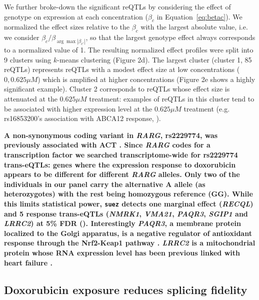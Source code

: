 \documentclass[9pt,lineno]{elife}
\newcommand{\tempbold}[1]{\textbf{#1}}
\begin{document}
We further broke-down the significant reQTLs by considering the effect of genotype on expression at each concentration ($\beta_c$ in Equation~\ref{eq:betac}). We normalized the effect sizes relative to the $\beta_c$ with the largest absolute value, i.e. we consider $\beta_c / \beta_{\arg \max{ |\beta_{c'}| }} $, so that the largest genotype effect always corresponds to a normalized value of 1. The resulting normalized effect profiles were split into 9 clusters using $k$-means clustering (Figure 2d). The largest cluster (cluster 1, 85 reQTLs) represents reQTLs with a modest effect size at low concentrations ($0,0.625\mu M$) which is amplified at higher concentrations (Figure 2e shows a highly significant example). Cluster 2 corresponds to reQTLs whose effect size is attenuated at the $0.625\mu M$ treatment: examples of reQTLs in this cluster tend to be associated with higher expression level at the $0.625\mu M$ treatment (e.g. rs16853200's association with ABCA12 response, ). 

\tempbold{ A non-synonymous coding variant in \emph{RARG}, rs2229774, was previously associated with ACT \citep{Aminkeng2015}. Since \emph{RARG} codes for a transcription factor we searched transcriptome-wide for rs2229774 trans-eQTLs: genes where the expression response to doxorubicin appears to be different for different \emph{RARG} alleles. Only two of the individuals in our panel carry the alternative A allele (as heterozygotes) with the rest being homozygous reference (GG). While this limits statistical power, \texttt{suez} detects one marginal effect (\emph{RECQL}) and 5 response trans-eQTLs (\emph{NMRK1}, \emph{VMA21}, \emph{PAQR3}, \emph{SGIP1} and \emph{LRRC2}) at 5\% FDR (\FIGSUPP[fig2]{rarg_hits}). Interestingly \emph{PAQR3}, a membrane protein localized to the Golgi apparatus, is a negative regulator of antioxidant response through the Nrf2-Keap1 pathway \citep{Zhang2016-rz}. \emph{LRRC2} is a mitochondrial protein whose RNA expression level has been previous linked with heart failure \citep{McDermott-Roe2017-db}. }

\subsection*{Doxorubicin exposure reduces splicing fidelity}

\end{document}
